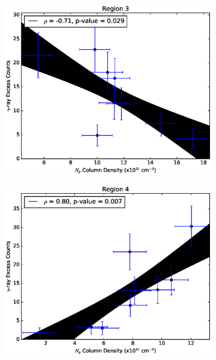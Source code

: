 \documentclass[12pt,a4paper]{article}
\begin{document}
\begin{figure}[H]
	\begin{subfigure}{0.5\textwidth}
		\centering
		\includegraphics[width=0.95\linewidth, height=0.27\textheight]{gamma_mHI_reg3}
		\label{fig:gmHIreg3}
	\end{subfigure}
	\begin{subfigure}{0.5\textwidth}
		\centering
		\includegraphics[width=0.9\linewidth, height=0.27\textheight]{gamma_mHI_reg4}
		\label{fig:gmHIreg4}
	\end{subfigure}
	\begin{subfigure}{0.5\textwidth}
		\centering

\end{subfigure}
\end{figure}
\end{document}
